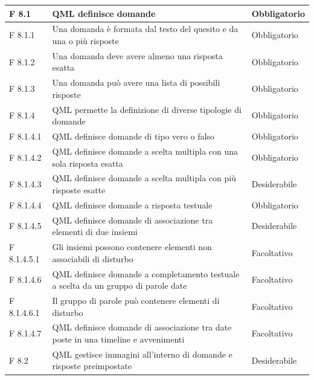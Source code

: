 \documentclass[a4paper,11pt]{article}
\begin{document}
\begin{longtable}{p{}p{}p{}}
\midrule
F 8.1 & QML definisce domande & Obbligatorio\\
\midrule
F 8.1.1 & Una domanda è formata dal testo del quesito e da una o più risposte & Obbligatorio\\
\midrule
F 8.1.2 & Una domanda deve avere almeno una risposta esatta & Obbligatorio\\
\midrule
F 8.1.3 & Una domanda può avere una lista di possibili risposte & Obbligatorio\\
\midrule
F 8.1.4 & QML permette la definizione di diverse tipologie di domande & Obbligatorio\\
\midrule
F 8.1.4.1 & QML definisce domande di tipo vero o falso & Obbligatorio\\
\midrule
F 8.1.4.2 & QML definisce domande a scelta multipla con una sola risposta esatta & Obbligatorio\\
\midrule
F 8.1.4.3 & QML definisce domande a scelta multipla con più risposte esatte & Desiderabile\\
\midrule
F 8.1.4.4 & QML definisce domande a risposta testuale & Obbligatorio\\
\midrule
F 8.1.4.5 & QML definisce domande di associazione tra elementi di due insiemi & Desiderabile\\
\midrule
F 8.1.4.5.1 & Gli insiemi possono contenere elementi non associabili di disturbo & Facoltativo\\
\midrule
F 8.1.4.6 & QML definisce domande a completamento testuale a scelta da un gruppo di parole date & Facoltativo\\
\midrule
F 8.1.4.6.1 & Il gruppo di parole può contenere elementi di disturbo & Facoltativo\\
\midrule
F 8.1.4.7 & QML definisce domande di associazione tra date poste in una timeline e avvenimenti & Facoltativo\\
\midrule
F 8.2 & QML gestisce immagini all'interno di domande e risposte preimpostate & Desiderabile\\
			
			\end{longtable}
\end{document}
